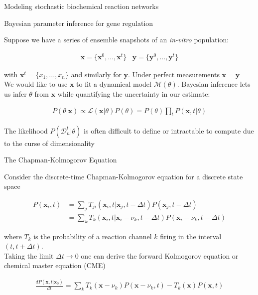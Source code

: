 \documentclass[aspectratio=1610]{beamer}					%
\begin{document}
\begin{section}{Modeling stochastic biochemical reaction networks}
\begin{frame}{Bayesian parameter inference for gene regulation}

Suppose we have a series of ensemble snapshots of an \emph{in-vitro} population:

\begin{align*}
\mathbf{x} = \{\mathbf{x}^{0}, ..., \mathbf{x}^{t}\}\;\;\; \mathbf{y} = \{\mathbf{y}^{0}, ..., \mathbf{y}^{t}\}
\end{align*}

with $\mathbf{x}^{t} = \{x_{1}, ..., x_{n}\}$ and similarly for $\mathbf{y}$. Under perfect measurements $\mathbf{x}=\mathbf{y}$\\
\vspace{0.2in}
We would like to use $\mathbf{x}$ to fit a dynamical model $\mathcal{M}(\theta)$. Bayesian inference lets us infer $\theta$ from $\mathbf{x}$ while quantifying the uncertainty in our estimate:

\begin{align*}
P(\theta|\mathbf{x}) \propto \mathcal{L}(\mathbf{x}|\theta)P(\theta) = P(\theta)\prod_{t} P(\mathbf{x},t|\theta)
\end{align*}

The likelihood $P(\mathcal{D}_{n}^{t}|\theta)$ is often difficult to define or intractable to compute due to the curse of dimensionality

\end{frame}

\begin{frame}{The Chapman-Kolmogorov Equation}

\vspace{0.1in}
Consider the discrete-time Chapman-Kolmogorov equation for a discrete state space

\begin{align*}
P(\mathbf{x}_{i},t) &= \sum_{j} T_{ji}(\mathbf{x}_{i},t|\mathbf{x}_{j},t-\Delta t)P(\mathbf{x}_{j},t-\Delta t)\\ 
&= \sum_{k} T_{k}(\mathbf{x}_{i},t|\mathbf{x}_{i}-\nu_{k},t-\Delta t)P(\mathbf{x}_{i}-\nu_{k},t-\Delta t)
\end{align*}

where $T_{k}$ is the probability of a reaction channel $k$ firing in the interval $(t,t+\Delta t)$.\\
\vspace{0.1in}
Taking the limit $\Delta t \rightarrow 0$ one can derive the forward Kolmogorov equation or chemical master equation (CME)

\begin{align*}
\frac{dP(\mathbf{x},t|\mathbf{x}_{0})}{dt} = \sum_{k} T_{k}(\mathbf{x}-\nu_{k})P(\mathbf{x}-\nu_{k},t) - T_{k}(\mathbf{x})P(\mathbf{x},t)
\end{align*}



\end{frame}

\end{section}
\end{document}
